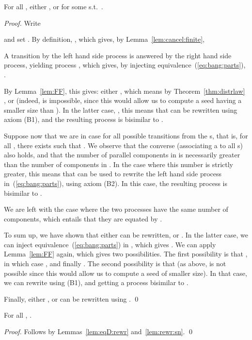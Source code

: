 \documentclass{llncs}
\begin{document}
\begin{lem}\label{lem:eqD:rewr}
  For all , either , or  for some
   s.t.\ .
\end{lem}
\begin{proof}
  Write
\noindent and set .
By definition, , which gives, by
Lemma~\ref{lem:cancel:finite}, 

A transition by the left hand side process is answered by the right
hand side process, yielding process
,
which 
gives, by injecting equivalence~(\ref{eq:bang:parts}), 
.

By Lemma~\ref{lem:FF}, this gives: either  , which
means by Theorem~\ref{thm:distrlaw} , or 
 (indeed,  is impossible, since this
would allow us to compute a seed having a smaller size than
). In the latter case, , this means that  can be
rewritten using axiom (B1), and the resulting process is bisimilar to
.

Suppose now that we are in case  for all possible transitions
from the s, that is, for all , there exists  such that
. We observe that the converse (associating a
 to all s) also holds, and that the number of parallel
components in  is necessarily greater than the
number of components in . In the case where this number is strictly
greater, this means that  can be used to rewrite the
left hand side process in~(\ref{eq:bang:parts}), using axiom (B2). In
this case, the resulting process is bisimilar to .

We are left with the case where the two processes have the same number
of components, which entails that they are equated by .

To sum up, we have shown that either  can be
rewritten, or . In the latter case, we can
inject equivalence~(\ref{eq:bang:parts}) in
, which gives
. We can apply Lemma~\ref{lem:FF} again,
which gives two possibilities. The first possibility is that
, in which case , and finally
. The second possibility is that  (as above,
 is not possible since this would allow us to compute
a seed of smaller size). In that case, we can 
rewrite  using (B1), and getting a process bisimilar to .

Finally, either , or  can be rewritten using
.
\qed
\end{proof}

\begin{prop}\label{prop:seed}
  For all , .
\end{prop}
\begin{proof}
  Follows by Lemmas~\ref{lem:eqD:rewr} and~\ref{lem:rewr:sn}.
\qed
\end{proof}
\end{document}

